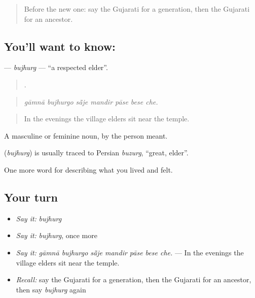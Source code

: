 \label{lesson:GU-C493-bujhurg}



\begin{quote}
Before the new one: say the Gujarati for a generation, then the Gujarati for an ancestor.
\end{quote}

\subsection*{You'll want to know: }
\textbf{} — \emph{bujhurg} — \textquotedblleft{}a respected elder\textquotedblright{}.

\begin{quote}
      .
\end{quote}

\begin{quote}
\emph{gāmnā bujhurgo sā̃je mandir pāse bese che.}
\end{quote}

\begin{quote}
In the evenings the village elders sit near the temple.
\end{quote}

A masculine or feminine noun, by the person meant.

\begin{cousinweb}
\textbf{} (\emph{bujhurg}) is usually traced to Persian \emph{buzurg}, \textquotedblleft{}great, elder\textquotedblright{}.
\end{cousinweb}

\begin{grammarlens}[title={What you've built}]
One more word for describing what you lived and felt.
\end{grammarlens}

\subsection*{Your turn}
\begin{itemize}
\raggedright
  \item \emph{Say it:} \emph{bujhurg}
  \item \emph{Say it:} \emph{bujhurg}, once more
  \item \emph{Say it:} \emph{gāmnā bujhurgo sā̃je mandir pāse bese che.} — In the evenings the village elders sit near the temple.
  \item \emph{Recall:} say the Gujarati for a generation, then the Gujarati for an ancestor, then say \emph{bujhurg} again
\end{itemize}

